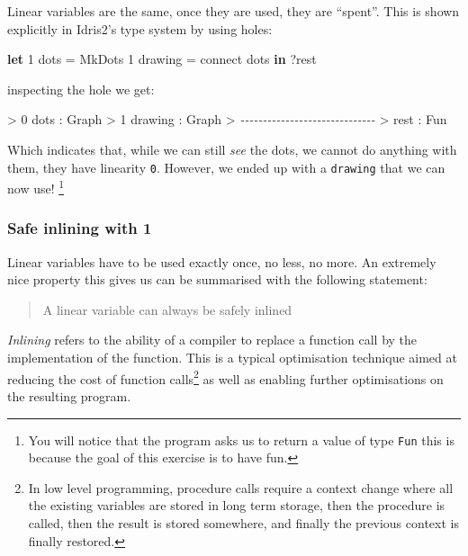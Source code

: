 \documentclass[
]{article}
\newenvironment{Shaded}{}{}
\newcommand{\CommentTok}[1]{\textcolor[rgb]{0.38,0.63,0.69}{\textit{#1}}}
\newcommand{\DataTypeTok}[1]{\textcolor[rgb]{0.56,0.13,0.00}{#1}}
\newcommand{\DecValTok}[1]{\textcolor[rgb]{0.25,0.63,0.44}{#1}}
\newcommand{\KeywordTok}[1]{\textcolor[rgb]{0.00,0.44,0.13}{\textbf{#1}}}
\newcommand{\NormalTok}[1]{#1}
\newcommand{\OperatorTok}[1]{\textcolor[rgb]{0.40,0.40,0.40}{#1}}
\newcommand{\OtherTok}[1]{\textcolor[rgb]{0.00,0.44,0.13}{#1}}
\begin{document}
Linear variables are the same, once they are used, they are ``spent''.
This is shown explicitly in Idris2's type system by using holes:

\begin{Shaded}
\begin{Highlighting}[]
\KeywordTok{let} \DecValTok{1}\NormalTok{ dots }\OtherTok{=} \DataTypeTok{MkDots}
    \DecValTok{1}\NormalTok{ drawing }\OtherTok{=}\NormalTok{ connect dots }\KeywordTok{in}
    \OperatorTok{?}\NormalTok{rest}
\end{Highlighting}
\end{Shaded}

inspecting the hole we get:

\begin{Shaded}
\begin{Highlighting}[]
\OperatorTok{\textgreater{}}  \DecValTok{0}\NormalTok{ dots }\OperatorTok{:} \DataTypeTok{Graph}
\OperatorTok{\textgreater{}}  \DecValTok{1}\NormalTok{ drawing }\OperatorTok{:} \DataTypeTok{Graph}
\OperatorTok{\textgreater{}} \CommentTok{{-}{-}{-}{-}{-}{-}{-}{-}{-}{-}{-}{-}{-}{-}{-}{-}{-}{-}{-}{-}{-}{-}{-}{-}{-}{-}{-}{-}{-}{-}}
\OperatorTok{\textgreater{}}\NormalTok{ rest }\OperatorTok{:} \DataTypeTok{Fun}
\end{Highlighting}
\end{Shaded}

Which indicates that, while we can still \emph{see} the dots, we cannot
do anything with them, they have linearity \texttt{0}. However, we ended
up with a \texttt{drawing} that we can now use! \footnote{You will
  notice that the program asks us to return a value of type \texttt{Fun}
  this is because the goal of this exercise is to have fun.}

\hypertarget{safe-inlining-with-1}{%
\subsubsection{Safe inlining with 1}\label{safe-inlining-with-1}}

Linear variables have to be used exactly once, no less, no more. An
extremely nice property this gives us can be summarised with the
following statement:

\begin{quote}
A linear variable can always be safely inlined
\end{quote}

\emph{Inlining} refers to the ability of a compiler to replace a
function call by the implementation of the function. This is a typical
optimisation technique aimed at reducing the cost of function
calls\footnote{In low level programming, procedure calls require a
  context change where all the existing variables are stored in long
  term storage, then the procedure is called, then the result is stored
  somewhere, and finally the previous context is finally restored.} as
well as enabling further optimisations on the resulting program.
\end{document}
